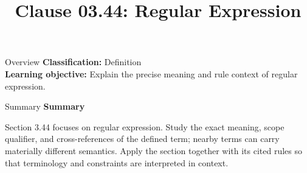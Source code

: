 \documentclass[10pt,letterpaper]{article}
\title{Clause 03.44: Regular Expression}
\author{}
\date{}
\begin{document}
\maketitle
\begin{CornellOverviewBox}{Overview}
\textbf{Classification:} Definition\\[2pt]
\textbf{Learning objective:} Explain the precise meaning and rule context of regular expression.
\end{CornellOverviewBox}\begin{CornellSummaryBox}{Summary}
{\sffamily\bfseries\color{Accent} Summary}\par\vspace{3pt}Section 3.44 focuses on regular expression. Study the exact meaning, scope qualifier, and cross-references of the defined term; nearby terms can carry materially different semantics. Apply the section together with its cited rules so that terminology and constraints are interpreted in context.
\end{CornellSummaryBox}
\end{document}
